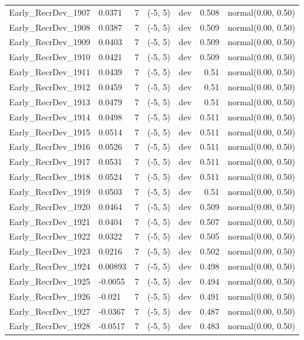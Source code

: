 \documentclass[
]{scrartcl}
\begin{document}
\begin{landscape}
\begin{longtable}{llrllrl}
Early\_RecrDev\_1907 & 0.0371 & 7 & (-5, 5) & dev & 0.508 & normal(0.00, 0.50) \\ 
Early\_RecrDev\_1908 & 0.0387 & 7 & (-5, 5) & dev & 0.509 & normal(0.00, 0.50) \\ 
Early\_RecrDev\_1909 & 0.0403 & 7 & (-5, 5) & dev & 0.509 & normal(0.00, 0.50) \\ 
Early\_RecrDev\_1910 & 0.0421 & 7 & (-5, 5) & dev & 0.509 & normal(0.00, 0.50) \\ 
Early\_RecrDev\_1911 & 0.0439 & 7 & (-5, 5) & dev & 0.51 & normal(0.00, 0.50) \\ 
Early\_RecrDev\_1912 & 0.0459 & 7 & (-5, 5) & dev & 0.51 & normal(0.00, 0.50) \\ 
Early\_RecrDev\_1913 & 0.0479 & 7 & (-5, 5) & dev & 0.51 & normal(0.00, 0.50) \\ 
Early\_RecrDev\_1914 & 0.0498 & 7 & (-5, 5) & dev & 0.511 & normal(0.00, 0.50) \\ 
Early\_RecrDev\_1915 & 0.0514 & 7 & (-5, 5) & dev & 0.511 & normal(0.00, 0.50) \\ 
Early\_RecrDev\_1916 & 0.0526 & 7 & (-5, 5) & dev & 0.511 & normal(0.00, 0.50) \\ 
Early\_RecrDev\_1917 & 0.0531 & 7 & (-5, 5) & dev & 0.511 & normal(0.00, 0.50) \\ 
Early\_RecrDev\_1918 & 0.0524 & 7 & (-5, 5) & dev & 0.511 & normal(0.00, 0.50) \\ 
Early\_RecrDev\_1919 & 0.0503 & 7 & (-5, 5) & dev & 0.51 & normal(0.00, 0.50) \\ 
Early\_RecrDev\_1920 & 0.0464 & 7 & (-5, 5) & dev & 0.509 & normal(0.00, 0.50) \\ 
Early\_RecrDev\_1921 & 0.0404 & 7 & (-5, 5) & dev & 0.507 & normal(0.00, 0.50) \\ 
Early\_RecrDev\_1922 & 0.0322 & 7 & (-5, 5) & dev & 0.505 & normal(0.00, 0.50) \\ 
Early\_RecrDev\_1923 & 0.0216 & 7 & (-5, 5) & dev & 0.502 & normal(0.00, 0.50) \\ 
Early\_RecrDev\_1924 & 0.00893 & 7 & (-5, 5) & dev & 0.498 & normal(0.00, 0.50) \\ 
Early\_RecrDev\_1925 & -0.0055 & 7 & (-5, 5) & dev & 0.494 & normal(0.00, 0.50) \\ 
Early\_RecrDev\_1926 & -0.021 & 7 & (-5, 5) & dev & 0.491 & normal(0.00, 0.50) \\ 
Early\_RecrDev\_1927 & -0.0367 & 7 & (-5, 5) & dev & 0.487 & normal(0.00, 0.50) \\ 
Early\_RecrDev\_1928 & -0.0517 & 7 & (-5, 5) & dev & 0.483 & normal(0.00, 0.50) \\ 

\end{longtable}
\end{landscape}
\end{document}
